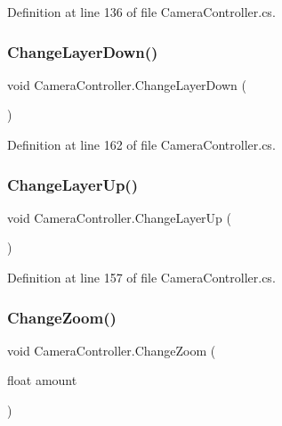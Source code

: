 Definition at line 136 of file Camera\+Controller.\+cs.

\mbox{\label{class_camera_controller_a3861db0c5202a3efc51ac3a87546d1db}} 
\subsubsection{\texorpdfstring{Change\+Layer\+Down()}{ChangeLayerDown()}}
{\footnotesize\ttfamily void Camera\+Controller.\+Change\+Layer\+Down (\begin{DoxyParamCaption}{ }\end{DoxyParamCaption})}



Definition at line 162 of file Camera\+Controller.\+cs.

\mbox{\label{class_camera_controller_aea1f76fa7604667f1442dc48be81fb2a}} 
\subsubsection{\texorpdfstring{Change\+Layer\+Up()}{ChangeLayerUp()}}
{\footnotesize\ttfamily void Camera\+Controller.\+Change\+Layer\+Up (\begin{DoxyParamCaption}{ }\end{DoxyParamCaption})}



Definition at line 157 of file Camera\+Controller.\+cs.

\mbox{\label{class_camera_controller_a5685e1f13b68e97d726cbb9ee92c55f7}} 
\subsubsection{\texorpdfstring{Change\+Zoom()}{ChangeZoom()}}
{\footnotesize\ttfamily void Camera\+Controller.\+Change\+Zoom (\begin{DoxyParamCaption}\item[{float}]{amount }\end{DoxyParamCaption})}



